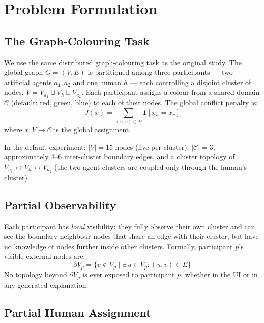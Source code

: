 \documentclass[10pt]{article}
\theoremstyle{definition}
\begin{document}
\section{Problem Formulation}
\label{sec:problem}

\subsection{The Graph-Colouring Task}

We use the same distributed graph-colouring task as the original study.  The global graph
$G = (V, E)$ is partitioned among three participants --- two artificial agents $a_1, a_2$ and one
human $h$ --- each controlling a disjoint cluster of nodes:
$V = V_{a_1} \sqcup V_h \sqcup V_{a_2}$.
Each participant assigns a colour from a shared domain $\mathcal{C}$ (default: red, green, blue)
to each of their nodes.  The global conflict penalty is:
\begin{equation}
  J(x) = \sum_{(u,v) \in E} \mathbf{1}[x_u = x_v]
  \label{eq:penalty}
\end{equation}
where $x: V \to \mathcal{C}$ is the global assignment.

In the default experiment: $|V| = 15$ nodes (five per cluster), $|\mathcal{C}| = 3$,
approximately 4--6 inter-cluster boundary edges, and a cluster topology of
$V_{a_1} \leftrightarrow V_h \leftrightarrow V_{a_2}$ (the two agent clusters are coupled only
through the human's cluster).

\subsection{Partial Observability}

Each participant has \emph{local} visibility: they fully observe their own cluster and can see
the boundary-neighbour nodes that share an edge with their cluster, but have no knowledge of
nodes further inside other clusters.  Formally, participant $p$'s visible external nodes are:
\[
  \partial V_p = \{v \notin V_p \mid \exists\, u \in V_p: (u,v) \in E\}
\]
No topology beyond $\partial V_p$ is ever exposed to participant $p$, whether in the UI or in any
generated explanation.

\subsection{Partial Human Assignment}
\end{document}
